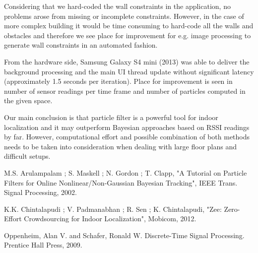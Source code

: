 \documentclass[conference]{IEEEtran}
\begin{document}
Considering that we hard-coded the wall constraints in the application, no problems arose from missing or incomplete constraints. However, in the case of more complex building it would be time consuming to hard-code all the walls and obstacles and therefore we see place for improvement for e.g. image processing to generate wall constraints in an automated fashion.

From the hardware side, Samsung Galaxy S4 mini (2013) was able to deliver the background processing and the main UI thread update without significant latency (approximately 1.5 seconds per iteration). Place for improvement is seen in number of sensor readings per time frame and number of particles computed in the given space. 

Our main conclusion is that particle filter is a powerful tool for indoor localization and it may outperform Bayesian approaches based on RSSI readings by far. However, computational effort and possible combination of both methods needs to be taken into consideration when dealing with large floor plans and difficult setups. 


\begin{thebibliography}{00}
  M.S. Arulampalam ; S. Maskell ; N. Gordon ; T. Clapp, "A Tutorial on Particle Filters for Online Nonlinear/Non-Gaussian Bayesian Tracking", IEEE Trans. Signal Processing, 2002.


  K.K. Chintalapudi ; V. Padmanabhan ; R. Sen ; K. Chintalapudi, "Zee: Zero-Effort Crowdsourcing for Indoor Localization", Mobicom, 2012.

 Oppenheim, Alan V. and Schafer, Ronald W. Discrete-Time Signal Processing. Prentice Hall Press, 2009.

\end{thebibliography}
\end{document}
